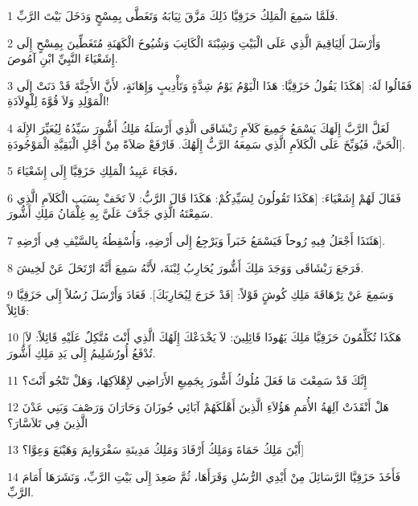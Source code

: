 \par 1 فَلَمَّا سَمِعَ الْمَلِكُ حَزَقِيَّا ذَلِكَ مَزَّقَ ثِيَابَهُ وَتَغَطَّى بِمِسْحٍ وَدَخَلَ بَيْتَ الرَّبِّ.
\par 2 وَأَرْسَلَ أَلِيَاقِيمَ الَّذِي عَلَى الْبَيْتِ وَشِبْنَةَ الْكَاتِبَ وَشُيُوخَ الْكَهَنَةِ مُتَغَطِّينَ بِمِسْحٍ إِلَى إِشَعْيَاءَ النَّبِيِّ ابْنِ آمُوصَ.
\par 3 فَقَالُوا لَهُ: [هَكَذَا يَقُولُ حَزَقِيَّا: هَذَا الْيَوْمُ يَوْمُ شِدَّةٍ وَتَأْدِيبٍ وَإِهَانَةٍ، لأَنَّ الأَجِنَّةَ قَدْ دَنَتْ إِلَى الْمَوْلِدِ وَلاَ قُوَّةَ لِلْوِلاَدَةِ!
\par 4 لَعَلَّ الرَّبَّ إِلَهَكَ يَسْمَعُ جَمِيعَ كَلاَمِ رَبْشَاقَى الَّذِي أَرْسَلَهُ مَلِكُ أَشُّورَ سَيِّدُهُ لِيُعَيِّرَ الإِلَهَ الْحَيَّ، فَيُوَبِّخَ عَلَى الْكَلاَمِ الَّذِي سَمِعَهُ الرَّبُّ إِلَهُكَ. فَارْفَعْ صَلاَةً مِنْ أَجْلِ الْبَقِيَّةِ الْمَوْجُودَةِ].
\par 5 فَجَاءَ عَبِيدُ الْمَلِكِ حَزَقِيَّا إِلَى إِشَعْيَاءَ،
\par 6 فَقَالَ لَهُمْ إِشَعْيَاءَ: [هَكَذَا تَقُولُونَ لِسَيِّدِكُمْ: هَكَذَا قَالَ الرَّبُّ: لاَ تَخَفْ بِسَبَبِ الْكَلاَمِ الَّذِي سَمِعْتَهُ الَّذِي جَدَّفَ عَلَيَّ بِهِ غِلْمَانُ مَلِكِ أَشُّورَ.
\par 7 هَئَنَذَا أَجْعَلُ فِيهِ رُوحاً فَيَسْمَعُ خَبَراً وَيَرْجِعُ إِلَى أَرْضِهِ، وَأُسْقِطُهُ بِالسَّيْفِ فِي أَرْضِهِ].
\par 8 فَرَجَعَ رَبْشَاقَى وَوَجَدَ مَلِكَ أَشُّورَ يُحَارِبُ لِبْنَةَ، لأَنَّهُ سَمِعَ أَنَّهُ ارْتَحَلَ عَنْ لَخِيشَ.
\par 9 وَسَمِعَ عَنْ تِرْهَاقَةَ مَلِكِ كُوشٍَ قَوْلاً: [قَدْ خَرَجَ لِيُحَارِبَكَ]. فَعَادَ وَأَرْسَلَ رُسُلاً إِلَى حَزَقِيَّا قَائِلاً:
\par 10 [هَكَذَا تُكَلِّمُونَ حَزَقِيَّا مَلِكَ يَهُوذَا قَائِلِينَ: لاَ يَخْدَعْكَ إِلَهُكَ الَّذِي أَنْتَ مُتَّكِلٌ عَلَيْهِ قَائِلاً: لاَ تُدْفَعُ أُورُشَلِيمُ إِلَى يَدِ مَلِكِ أَشُّورَ.
\par 11 إِنَّكَ قَدْ سَمِعْتَ مَا فَعَلَ مُلُوكُ أَشُّورَ بِجَمِيعِ الأَرَاضِي لإِهْلاَكِهَا، وَهَلْ تَنْجُو أَنْتَ؟
\par 12 هَلْ أَنْقَذَتْ آلِهَةُ الأُمَمِ هَؤُلاَءِ الَّذِينَ أَهْلَكَهُمْ آبَائِي جُوزَانَ وَحَارَانَ وَرَصْفَ وَبَنِي عَدْنَ الَّذِينَ فِي تَلاَسَّارَ؟
\par 13 أَيْنَ مَلِكُ حَمَاةَ وَمَلِكُ أَرْفَادَ وَمَلِكُ مَدِينَةِ سَفْرَوَايِمَ وَهَيْنَعَ وَعِوَّا؟]
\par 14 فَأَخَذَ حَزَقِيَّا الرَّسَائِلَ مِنْ أَيْدِي الرُّسُلِ وَقَرَأَهَا، ثُمَّ صَعِدَ إِلَى بَيْتِ الرَّبِّ، وَنَشَرَهَا أَمَامَ الرَّبِّ.
